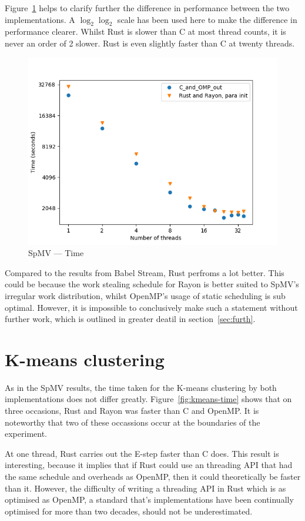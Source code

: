 Figure~\ref{fig:sparse-time} helps to clarify further the difference in performance between  the two implementations. A $\log_2 \log_2$ scale has been used here to make the difference in performance clearer. Whilst Rust is slower than C at most thread counts, it is never an order of 2 slower.
Rust is even slightly faster than C at twenty threads. 
\begin{figure}[h]
\centering
\includegraphics[width=.9\linewidth]{figs/sparse/time.png}
\caption{SpMV --- Time}\label{fig:sparse-time}
\end{figure}

Compared to the results from Babel Stream, Rust perfroms a lot better. This could be because the work stealing schedule for Rayon is better suited to SpMV's irregular work distribution, whilst OpenMP's usage of static scheduling is sub optimal. However, it is impossible to conclusively make such a statement without further work, which is outlined in greater deatil in section~\ref{sec:furth}.


\section{K-means clustering}

As in the SpMV results, the time taken for the K-means clustering by both implementations does not differ greatly. Figure~\ref{fig:kmeans-time} shows that on three occasions, Rust and Rayon was faster than C and OpenMP. It is noteworthy that two of these occassions occur at the boundaries of the experiment.

At one thread, Rust carries out the E-step faster than C does. This result is interesting, because it implies that if Rust could use an threading API that had the same schedule and overheads as OpenMP, then it could theoretically be faster than it. However, the difficulty of writing a threading API in Rust which is as optimised as OpenMP, a standard that's implementations have been continually optimised for more than two decades, should not be underestimated.


